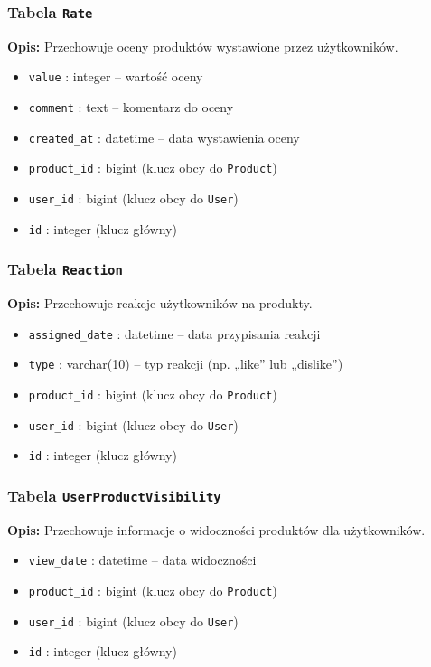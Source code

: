 \documentclass[12pt,a4paper,oneside]{article}
\theoremstyle{definition}
\numberwithin{equation}{section}
\begin{document}
\subsubsection*{Tabela \texttt{Rate}}
\textbf{Opis:} Przechowuje oceny produktów wystawione przez użytkowników.
\begin{itemize}
    \item \texttt{value} : integer – wartość oceny
    \item \texttt{comment} : text – komentarz do oceny
    \item \texttt{created\string_at} : datetime – data wystawienia oceny
    \item \texttt{product\string_id} : bigint (klucz obcy do \texttt{Product})
    \item \texttt{user\string_id} : bigint (klucz obcy do \texttt{User})
    \item \texttt{id} : integer (klucz główny)
\end{itemize}

\subsubsection*{Tabela \texttt{Reaction}}
\textbf{Opis:} Przechowuje reakcje użytkowników na produkty.
\begin{itemize}
    \item \texttt{assigned\string_date} : datetime – data przypisania reakcji
    \item \texttt{type} : varchar(10) – typ reakcji (np. „like” lub „dislike”)
    \item \texttt{product\string_id} : bigint (klucz obcy do \texttt{Product})
    \item \texttt{user\string_id} : bigint (klucz obcy do \texttt{User})
    \item \texttt{id} : integer (klucz główny)
\end{itemize}

\subsubsection*{Tabela \texttt{UserProductVisibility}}
\textbf{Opis:} Przechowuje informacje o widoczności produktów dla użytkowników.
\begin{itemize}
    \item \texttt{view\string_date} : datetime – data widoczności
    \item \texttt{product\string_id} : bigint (klucz obcy do \texttt{Product})
    \item \texttt{user\string_id} : bigint (klucz obcy do \texttt{User})
    \item \texttt{id} : integer (klucz główny)
\end{itemize}
\end{document}
